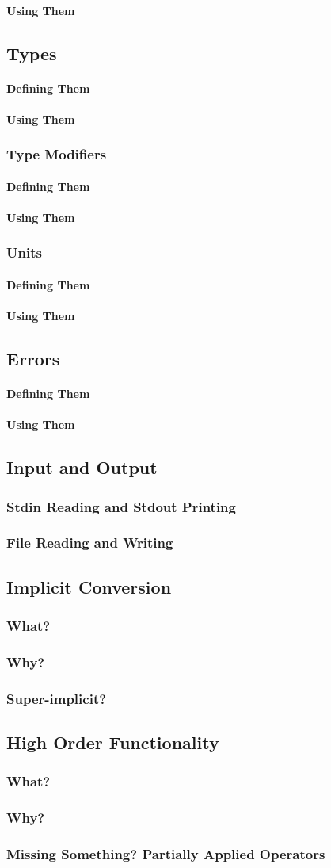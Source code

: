 \documentclass{article}
\newcommand{\ssecl}[1]{\subsection{#1}\label{ssec:#1}}
\newcommand{\sssecl}[1]{\subsubsection{#1}\label{sssec:#1}}
\begin{document}
\paragraph{Using Them}
\ssecl{Types}
\paragraph{Defining Them}

\paragraph{Using Them}

\sssecl{Type Modifiers}
\paragraph{Defining Them}

\paragraph{Using Them}

\sssecl{Units}
\paragraph{Defining Them}

\paragraph{Using Them}

\ssecl{Errors}
\paragraph{Defining Them}

\paragraph{Using Them}

\ssecl{Input and Output}
\sssecl{Stdin Reading and Stdout Printing}

\sssecl{File Reading and Writing}

\ssecl{Implicit Conversion}
\sssecl{What?}

\sssecl{Why?}

\sssecl{Super-implicit?}

\ssecl{High Order Functionality}
\sssecl{What?}

\sssecl{Why?}

\sssecl{Missing Something? Partially Applied Operators}
\end{document}
